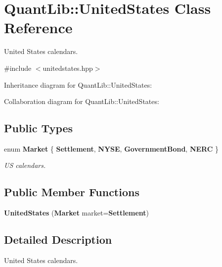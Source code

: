\section{Quant\+Lib\+:\+:United\+States Class Reference}
\label{class_quant_lib_1_1_united_states}


United States calendars.  




{\ttfamily \#include $<$unitedstates.\+hpp$>$}



Inheritance diagram for Quant\+Lib\+:\+:United\+States\+:


Collaboration diagram for Quant\+Lib\+:\+:United\+States\+:
\subsection*{Public Types}
\begin{DoxyCompactItemize}
\item 
enum {\bf Market} \{ {\bf Settlement}, 
{\bf N\+Y\+SE}, 
{\bf Government\+Bond}, 
{\bf N\+E\+RC}
 \}\begin{DoxyCompactList}\small\item\em US calendars. \end{DoxyCompactList}
\end{DoxyCompactItemize}
\subsection*{Public Member Functions}
\begin{DoxyCompactItemize}
\item 
{\bf United\+States} ({\bf Market} market={\bf Settlement})
\end{DoxyCompactItemize}


\subsection{Detailed Description}
United States calendars. 


